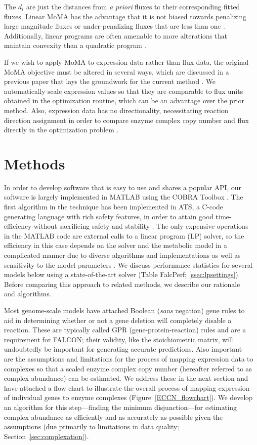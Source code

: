 The $d_i$ are just the distances from \textit{a priori} fluxes to
their corresponding fitted fluxes.  Linear MoMA has the advantage that
it is not biased towards penalizing large magnitude fluxes or
under-penalizing fluxes that are less than one
\citep{Boyd2004,Shlomi2005}. Additionally, linear programs are often
amenable to more alterations that maintain convexity than a quadratic
program \citep{Boyd2004}.

If we wish to apply MoMA to expression data rather than flux data, the
original MoMA objective must be altered in several ways, which are
discussed in a previous paper that lays the groundwork for the current
method \citep{Lee2012}. We automatically scale expression values so
that they are comparable to flux units obtained in the optimization
routine, which can be an advantage over the prior method. Also,
expression data has no directionality, necessitating reaction
direction assignment in order to compare enzyme complex copy number
and flux directly in the optimization problem \citep{Lee2012}.

\section{Methods}

In order to develop software that is easy to use and shares a popular API,
our software is largely implemented in MATLAB using the COBRA
Toolbox \citep{Hyduke2011}. The first algorithm in the technique
has been implemented in ATS, a C-code generating language with rich
safety features, in order to attain good time-efficiency without sacrificing
safety and stability \citep{ATStypes03}. The only expensive operations in the
MATLAB code are external calls to a linear program (LP) solver,
so the efficiency in this case depends on the solver and the metabolic
model in a complicated manner due to diverse algorithms and
implementations as well as sensitivity to the model parameters
\citep{Mittelmann2013,Todd2002}. We discuss performance statistics for
several models below using a state-of-the-art solver (Table FalcPerf; 
\ref{ssec:lpsettings}). Before comparing this approach to related methods, we
describe our rationale and algorithms.

Most genome-scale models have attached Boolean (\textit{sans}
negation) gene rules to aid in determining whether or not a gene
deletion will
completely disable a reaction. These are typically called GPR
(gene-protein-reaction) rules and are a requirement for FALCON; their
validity, like the stoichiometric matrix, will undoubtedly be
important for generating accurate predictions. Also important are the
assumptions and limitations for the process of mapping expression data
to complexes so that a scaled enzyme complex copy number (hereafter
referred to as complex abundance) can be estimated. We address these
in the next section and have attached a flow chart to illustrate the
overall process of mapping expression of individual genes to enzyme
complexes (Figure~\ref{ECCN_flowchart}). We develop an algorithm for
this step---finding the minimum disjunction---for estimating complex
abundance as efficiently and as accurately as possible given the
assumptions (due primarily to limitations in data quality; \suppOrApp
Section~\ref{sec:complexation}).

